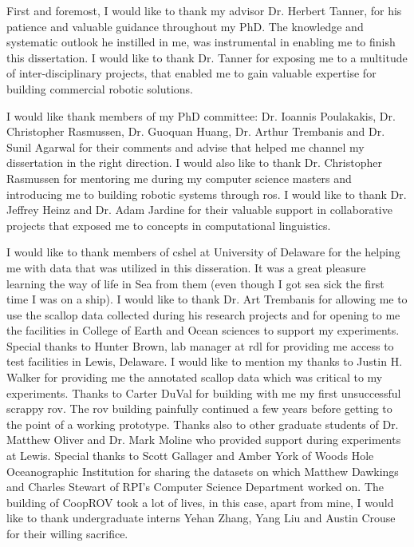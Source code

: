 First and foremost, I would like to thank my advisor Dr. Herbert Tanner, for his patience and valuable guidance throughout my PhD. The knowledge and systematic outlook he instilled in me, was instrumental in enabling me to finish this dissertation. I would like to thank Dr. Tanner for exposing me to a multitude of inter-disciplinary projects, that enabled me to gain valuable expertise for building commercial robotic solutions.

I would like thank members of my PhD committee: Dr. Ioannis Poulakakis, 
Dr. Christopher Rasmussen, Dr. Guoquan Huang, Dr. Arthur Trembanis and Dr. Sunil Agarwal for their comments and advise that helped me channel my dissertation in the right direction. I would also like to thank Dr. Christopher Rasmussen for mentoring me during my computer science masters and introducing me to building robotic systems through \gls{ros}. I would like to thank Dr. Jeffrey Heinz and Dr. Adam Jardine for their valuable support in collaborative projects that exposed me to concepts in computational linguistics.

I would like to thank members of \gls{cshel} at University of Delaware for the helping me with data that was utilized in this disseration. It was a great pleasure learning the way of life in Sea from them (even though I got sea sick the first time I was on a ship). I would like to thank Dr. Art Trembanis for allowing me to use the scallop data collected during his research projects and for opening to me the facilities in College of Earth and Ocean sciences to support my experiments. Special thanks to Hunter Brown, lab manager at \gls{rdl} for providing me access to test facilities in Lewis, Delaware. I would like to mention my thanks to Justin H. Walker for providing me the annotated scallop data which was critical to my experiments. Thanks to Carter DuVal for building with me my first unsuccessful scrappy \gls{rov}. The \gls{rov} building painfully continued a few years before getting to the point of a working prototype. Thanks also to other graduate students of Dr. Matthew Oliver and Dr. Mark Moline who 
provided 
support during experiments at Lewis. Special thanks to Scott Gallager and Amber York of Woods Hole Oceanographic Institution for sharing the datasets on which Matthew Dawkings and Charles Stewart of RPI’s Computer Science Department worked on. The building of CoopROV took a lot of lives, in this case, apart from mine, I would like to thank undergraduate interns Yehan Zhang, Yang Liu and Austin Crouse for their willing sacrifice.


